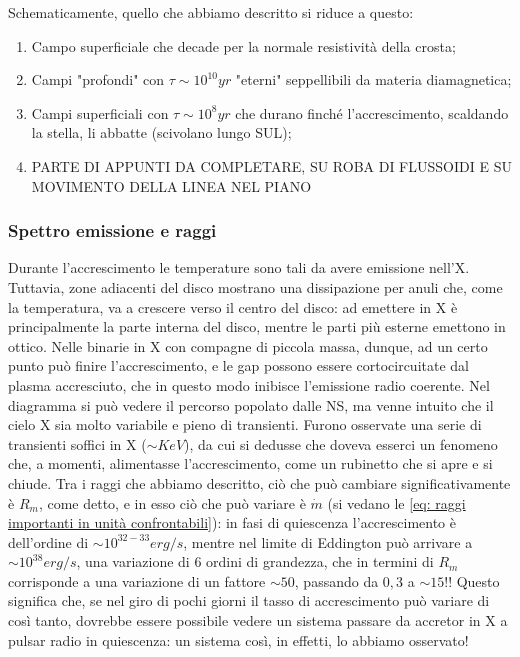 Schematicamente, quello che abbiamo descritto si riduce a questo:
\begin{enumerate}
    \item Campo superficiale che decade per la normale resistività della crosta;
    \item Campi "profondi" con $\tau \sim 10^{10}yr$ "eterni" seppellibili da materia diamagnetica;
    \item Campi superficiali con $\tau\sim10^8yr$ che durano finché l'accrescimento, scaldando la stella, li abbatte (scivolano lungo SUL);
    \item PARTE DI APPUNTI DA COMPLETARE, SU ROBA DI FLUSSOIDI E SU MOVIMENTO DELLA LINEA NEL PIANO
\end{enumerate}

\subsubsection{Spettro emissione e raggi}
Durante l'accrescimento le temperature sono tali da avere emissione nell'X. Tuttavia, zone adiacenti del disco mostrano una dissipazione per anuli che, come la temperatura, va a crescere verso il centro del disco:
ad emettere in X è principalmente la parte interna del disco, mentre le parti più esterne emettono in ottico.
Nelle binarie in X con compagne di piccola massa, dunque, ad un certo punto può finire l'accrescimento, e le gap possono essere cortocircuitate dal plasma accresciuto, che in questo modo inibisce l'emissione radio coerente.
Nel diagramma si può vedere il percorso popolato dalle NS, ma venne intuito che il cielo X sia molto variabile e pieno di transienti.
Furono osservate una serie di transienti soffici in X ($\sim KeV$), da cui si dedusse che doveva esserci un fenomeno che, a momenti, alimentasse l'accrescimento, come un rubinetto che si apre e si chiude.
Tra i raggi che abbiamo descritto, ciò che può cambiare significativamente è $R_m$, come detto, e in esso ciò che può variare è $\dot{m}$ (si vedano le \eqref{eq: raggi importanti in unità confrontabili}):
in fasi di quiescenza l'accrescimento è dell'ordine di $\sim10^{32-33}erg/s $, mentre nel limite di Eddington può arrivare a $\sim10^{38}erg/s $, una variazione di $6$ ordini di grandezza, che in termini di $R_m$ corrisponde a una variazione di un fattore $\sim50$, passando da $0,3$ a $\sim 15$!!
Questo significa che, se nel giro di pochi giorni il tasso di accrescimento può variare di così tanto, dovrebbe essere possibile vedere un sistema passare da accretor in X a pulsar radio in quiescenza: un sistema così, in effetti, lo abbiamo osservato!

